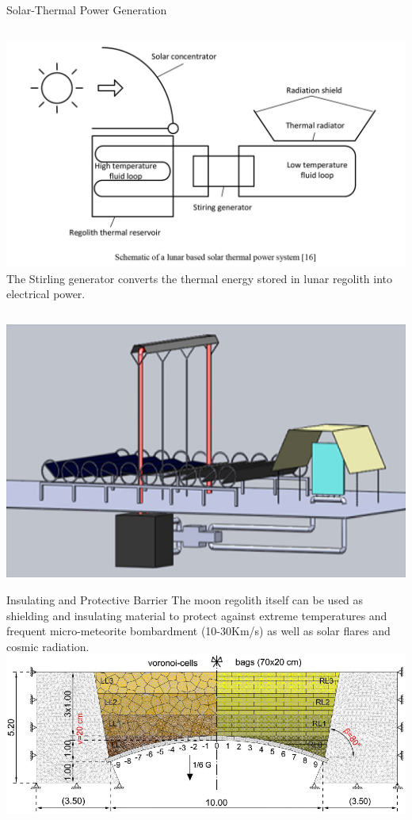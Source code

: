 \documentclass{beamer}
\begin{document}
\begin{frame}{Solar-Thermal Power Generation}
       \begin{columns}
             \centering
             \includegraphics[width= \textwidth]{Solar_thermal.jpg}
              The Stirling generator converts the
thermal energy stored in lunar regolith into electrical power.\cite{Yao}\cite{Climent}
         \end{columns} 
         \center
         \includegraphics[width= .5\textwidth]{Heat_night.eps}
    \end{frame}



\begin{frame}{Insulating and Protective Barrier }
The moon regolith itself can be used as shielding and insulating material to protect against extreme temperatures and frequent micro-meteorite bombardment (10-30Km/s) as well as solar flares and cosmic radiation.
\cite{Toth}
\center
\includegraphics[width= .95\textwidth]{bags.eps}   
\end{frame}
\end{document}
